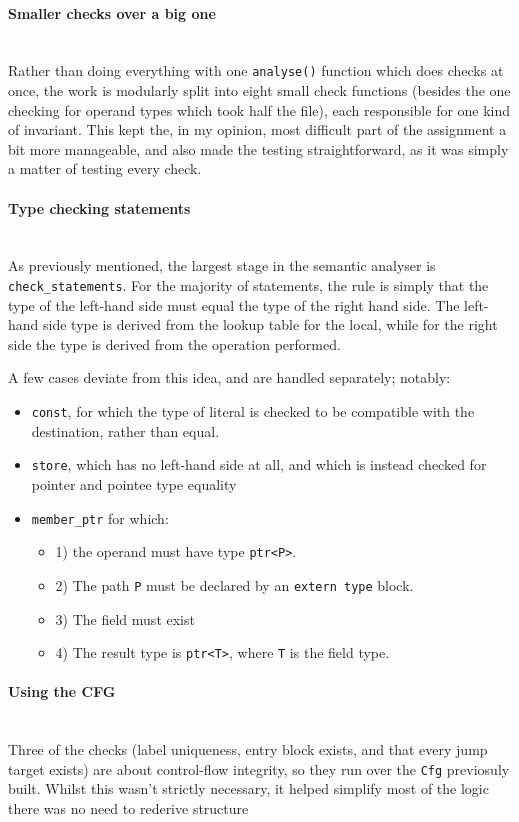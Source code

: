 \documentclass[11pt,a4paper,oneside]{report}
\begin{document}
	
	\paragraph{Smaller checks over a big one}\mbox{}\\
	Rather than doing everything with one \texttt{analyse()} function which does checks at once, the work is modularly split into eight small check functions (besides the one checking for operand types which took half the file), each responsible for one kind of invariant. This kept the, in my opinion, most difficult part of the assignment a bit more manageable, and also made the testing straightforward, as it was simply a matter of testing every check. 
	
	\paragraph{Type checking statements}\mbox{}\\
	As previously mentioned, the largest stage in the semantic analyser is \texttt{check\_statements}. For the majority of statements, the rule is simply that the type of the left-hand side must equal the type of the right hand side. The left-hand side type is derived from the lookup table for the local, while for the right side the type is derived from the operation performed. 
	
	A few cases deviate from this idea, and are handled separately; notably:
	\begin{itemize}
		\item \texttt{const}, for which the type of literal is checked to be compatible with the destination, rather than equal.
		\item \texttt{store}, which has no left-hand side at all, and which is instead checked for pointer and pointee type equality
		\item \texttt{member\_ptr} for which: 
		\begin{itemize}
			\item 1) the operand must have type \texttt{ptr<P>}.
			\item 2) The path \texttt{P} must be declared by an \texttt{extern type} block.
			\item 3) The field must exist
			\item 4) The result type is \texttt{ptr<T>}, where \texttt{T} is the field type.
		\end{itemize}
	\end{itemize} 
	
	\paragraph{Using the CFG}\mbox{}\\
	Three of the checks (label uniqueness, entry block exists, and that every jump target exists) are about control-flow integrity, so they run over the \texttt{Cfg} previosuly built. Whilst this wasn't strictly necessary, it helped simplify most of the logic there was no need to rederive structure
	
\end{document}
